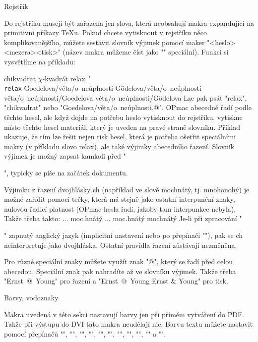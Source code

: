 \begtt
\sec Rejstřík
 \makeindex \endmulti
\endtt

Do rejstříku musejí být zařazena jen  slova, která neobsahují makra
expandující na primitivní příkazy \TeX{}u. Pokud chcete vytisknout v rejstříku
něco komplikovanějšího, můžete sestavit slovník výjimek pomocí 
maker "\iis <heslo><mezera>{<tisk>}" 
(název makra můžeme číst jako "\ii" speciální). 
Funkci si vysvětlíme na příkladu:

\begtt
\iis chikvadrat {$\chi$-kvadrát}
\iis relax {{\tt \char`\\relax}}
\iis Goedelova/věta/o~neúplnosti {G\"odelova/věta/o~neúplnosti}
\iis věta/o~neúplnosti/Goedelova {věta/o~neúplnosti/G\"odelova}
\endtt
%
Lze pak psát "\ii relax", "\ii chikvadrat" nebo 
"\ii Goedelova/věta/o~neúplnosti,@". 
OPmac abecedně řadí podle těchto hesel, ale když dojde
na potřebu heslo vytisknout do rejstříku, vytiskne místo těchto hesel
materiál, 
který je uveden na pravé straně slovníku. 
Příklad ukazuje, že tím lze
řešit nejen tisk hesel, která je potřeba ošetřit
speciálními makry (v příkladu slovo relax), ale také
výjimky abecedního řazení.
%
Slovník výjimek je možný zapsat kamkoli před "\makeindex", 
typicky se píše na začátek dokumentu. 

Výjimku z řazení dvojhlásky ch (například ve slově mochnátý, tj. mnohonohý)
je možné zařídit pomocí tečky, která má stejně jako ostatní interpunční
znaky, nulovou řadicí platnost (OPmac hesla řadí, jakoby tam interpunkce
nebyla). Takže třeba takto:
\begtt
... \ii moc.hnátý ...
\iis moc.hnátý {mochnátý} 
\endtt
%
Je-li při zpracování "\makeindex" zapnutý anglický jazyk (implicitní
nastavení nebo po přepínači
"\ehyph"), pak se ch neinterpretuje jako dvojhláska. Ostatní pravidla řazení
zůstávají nezměněna.

Pro různé speciální znaky můžete využít znak "@", který se řadí před celou
abecedou. Speciální znak pak nahradíte až ve slovníku výjimek.
Takže třeba "\ii Ernst~@~Young" pro řazení a
"\iis Ernst~@~Young {Ernst \& Young}" pro tisk.


\sec Barvy, vodoznaky

Makra uvedená v této sekci nastavují barvy jen při přímém
vytváření do PDF. Takže při výstupu do DVI tato makra neudělají nic.
%
Barvu textu můžete nastavit pomocí přepínačů 
{\localcolor\Blue "\Blue"}, 
{\localcolor\Red "\Red"}, 
{\localcolor\Brown "\Brown"},
{\localcolor\Green "\Green"}, 
{\localcolor\Yellow "\Yellow"}, 
{\localcolor\Cyan "\Cyan"}, 
{\localcolor\Magenta "\Magenta"}, 
{"\White"}, 
{\localcolor\Grey "\Grey"}, 
{\localcolor\LightGrey "\LightGrey"} a 
{"\Black"}. 


